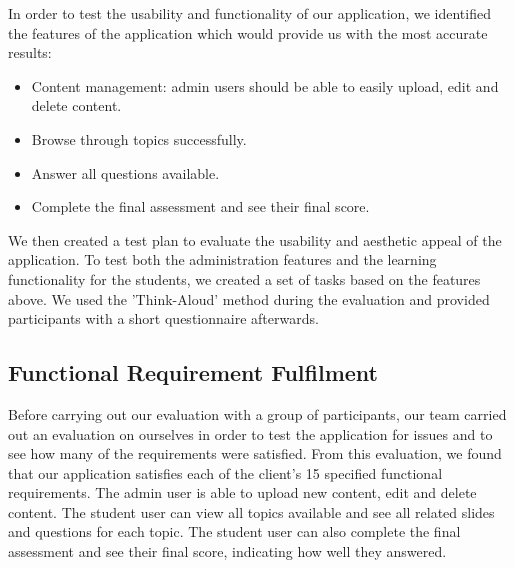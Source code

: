 \documentclass{l3proj}
\begin{document}
{In order to test the usability and functionality of our application, we identified the features of the application which would provide us with the most accurate results:

\begin{itemize}
\item Content management: admin users should be able to easily upload, edit and delete content.
\item Browse through topics successfully.
\item Answer all questions available.
\item Complete the final assessment and see their final score. 
\end{itemize}

We then created a test plan to evaluate the usability and aesthetic appeal of the application. To test both the administration features and the learning functionality for the students, we created a set of tasks based on the features above. We used the 'Think-Aloud' method during the evaluation and provided participants with a short questionnaire afterwards.

\subsection{Functional Requirement Fulfilment}

%

Before carrying out our evaluation with a group of participants, our team carried out an evaluation on ourselves in order to test the application for issues and to see how many of the requirements were satisfied. From this evaluation, we found that our application satisfies each of the client's 15 specified functional requirements. The admin user is able to upload new content, edit and delete content. The student user can view all topics available and see all related slides and questions for each topic. The student user can also complete the final assessment and see their final score, indicating how well they answered.

}
\end{document}

